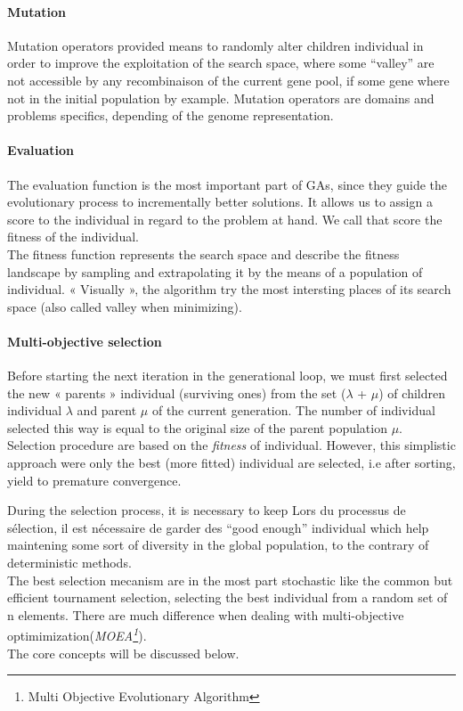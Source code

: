 \documentclass[12pt]{memoir}
\begin{document}
\paragraph{Mutation} %
\label{par:Mutation}

Mutation operators provided means to randomly alter children individual in order
to improve the exploitation of the search space, where some “valley” are not 
accessible by any recombinaison of the current gene pool, if some gene where
not in the initial population by example.
Mutation operators are domains and problems specifics, depending of the genome representation.

\paragraph{Evaluation} %
\label{par:Evaluation}
The evaluation function is the most important part of GAs, since they guide the 
evolutionary process to incrementally better solutions. It allows us to assign 
a score to the individual in regard to the problem at hand. We call that score
the fitness of the individual. \\
The fitness function represents the search space and describe the fitness landscape
by sampling and extrapolating it by the means of a population of individual.
« Visually », the algorithm try the most intersting places of its search space (also called valley when minimizing).


\paragraph{Multi-objective selection } %

Before starting the next iteration in the generational loop, we must first selected the new « parents
» individual (surviving ones) from the set ($\lambda$ + $\mu$) of children
individual $\lambda$ and parent $\mu$ of the current generation. The number 
of individual selected this way is equal to the original size of the parent population  $\mu$. \\
Selection procedure are based on the \emph{fitness} of individual. However,
this simplistic approach were only the best (more fitted) individual are selected,
i.e after sorting, yield to premature convergence.


\bigskip
During the selection process, it is necessary to keep  
Lors du processus de sélection, il est nécessaire de garder des 
``good enough\cite{sharma2010archived,deb2002fast}'' individual
which help maintening some sort of diversity in the global population,
to the contrary of deterministic methods. \\
The best selection mecanism are in the most part stochastic like the 
common but efficient tournament selection, selecting the best individual
from a random set of n elements. There are much difference when dealing with 
multi-objective optimimization(\emph{MOEA\footnote{Multi Objective Evolutionary
Algorithm}}).\\
The core concepts will be discussed below.
\end{document}
